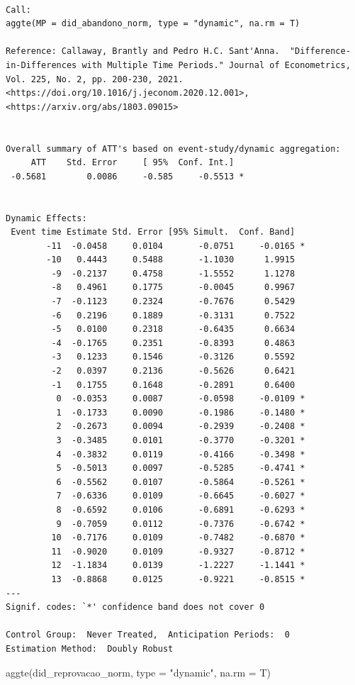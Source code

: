 \documentclass[
  letterpaper,
  DIV=11,
  numbers=noendperiod]{scrartcl}
\newenvironment{Shaded}{\begin{snugshade}}{\end{snugshade}}
\newcommand{\AttributeTok}[1]{\textcolor[rgb]{0.40,0.45,0.13}{#1}}
\newcommand{\FunctionTok}[1]{\textcolor[rgb]{0.28,0.35,0.67}{#1}}
\newcommand{\NormalTok}[1]{\textcolor[rgb]{0.00,0.23,0.31}{#1}}
\newcommand{\StringTok}[1]{\textcolor[rgb]{0.13,0.47,0.30}{#1}}
\begin{document}
\begin{verbatim}

Call:
aggte(MP = did_abandono_norm, type = "dynamic", na.rm = T)

Reference: Callaway, Brantly and Pedro H.C. Sant'Anna.  "Difference-in-Differences with Multiple Time Periods." Journal of Econometrics, Vol. 225, No. 2, pp. 200-230, 2021. <https://doi.org/10.1016/j.jeconom.2020.12.001>, <https://arxiv.org/abs/1803.09015> 


Overall summary of ATT's based on event-study/dynamic aggregation:  
     ATT    Std. Error     [ 95%  Conf. Int.]  
 -0.5681        0.0086     -0.585     -0.5513 *


Dynamic Effects:
 Event time Estimate Std. Error [95% Simult.  Conf. Band]  
        -11  -0.0458     0.0104       -0.0751     -0.0165 *
        -10   0.4443     0.5488       -1.1030      1.9915  
         -9  -0.2137     0.4758       -1.5552      1.1278  
         -8   0.4961     0.1775       -0.0045      0.9967  
         -7  -0.1123     0.2324       -0.7676      0.5429  
         -6   0.2196     0.1889       -0.3131      0.7522  
         -5   0.0100     0.2318       -0.6435      0.6634  
         -4  -0.1765     0.2351       -0.8393      0.4863  
         -3   0.1233     0.1546       -0.3126      0.5592  
         -2   0.0397     0.2136       -0.5626      0.6421  
         -1   0.1755     0.1648       -0.2891      0.6400  
          0  -0.0353     0.0087       -0.0598     -0.0109 *
          1  -0.1733     0.0090       -0.1986     -0.1480 *
          2  -0.2673     0.0094       -0.2939     -0.2408 *
          3  -0.3485     0.0101       -0.3770     -0.3201 *
          4  -0.3832     0.0119       -0.4166     -0.3498 *
          5  -0.5013     0.0097       -0.5285     -0.4741 *
          6  -0.5562     0.0107       -0.5864     -0.5261 *
          7  -0.6336     0.0109       -0.6645     -0.6027 *
          8  -0.6592     0.0106       -0.6891     -0.6293 *
          9  -0.7059     0.0112       -0.7376     -0.6742 *
         10  -0.7176     0.0109       -0.7482     -0.6870 *
         11  -0.9020     0.0109       -0.9327     -0.8712 *
         12  -1.1834     0.0139       -1.2227     -1.1441 *
         13  -0.8868     0.0125       -0.9221     -0.8515 *
---
Signif. codes: `*' confidence band does not cover 0

Control Group:  Never Treated,  Anticipation Periods:  0
Estimation Method:  Doubly Robust
\end{verbatim}

\begin{Shaded}
\begin{Highlighting}[]
\FunctionTok{aggte}\NormalTok{(did\_reprovacao\_norm, }\AttributeTok{type =} \StringTok{"dynamic"}\NormalTok{, }\AttributeTok{na.rm =}\NormalTok{ T)}
\end{Highlighting}
\end{Shaded}
\end{document}
